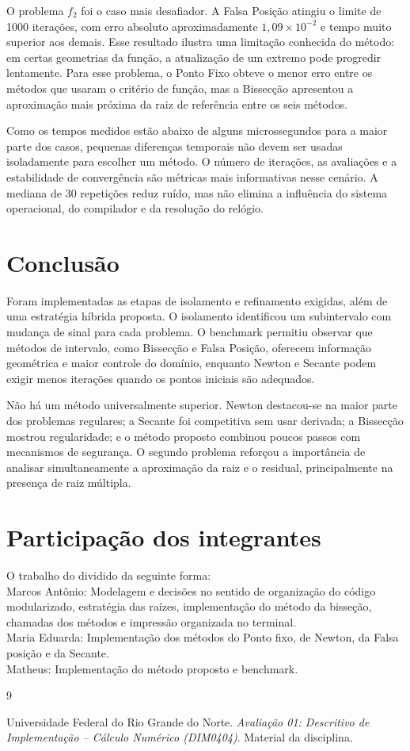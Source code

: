 \documentclass[12pt,a4paper]{article}
\begin{document}
O problema $f_2$ foi o caso mais desafiador. A Falsa Posição atingiu o limite de 1000 iterações, com erro absoluto aproximadamente $1,09\times10^{-2}$ e tempo muito superior aos demais. Esse resultado ilustra uma limitação conhecida do método: em certas geometrias da função, a atualização de um extremo pode progredir lentamente. Para esse problema, o Ponto Fixo obteve o menor erro entre os métodos que usaram o critério de função, mas a Bissecção apresentou a aproximação mais próxima da raiz de referência entre os seis métodos.

Como os tempos medidos estão abaixo de alguns microssegundos para a maior parte dos casos, pequenas diferenças temporais não devem ser usadas isoladamente para escolher um método. O número de iterações, as avaliações e a estabilidade de convergência são métricas mais informativas nesse cenário. A mediana de 30 repetições reduz ruído, mas não elimina a influência do sistema operacional, do compilador e da resolução do relógio.

\section{Conclusão}

Foram implementadas as etapas de isolamento e refinamento exigidas, além de uma estratégia híbrida proposta. O isolamento identificou um subintervalo com mudança de sinal para cada problema. O benchmark permitiu observar que métodos de intervalo, como Bissecção e Falsa Posição, oferecem informação geométrica e maior controle do domínio, enquanto Newton e Secante podem exigir menos iterações quando os pontos iniciais são adequados.

Não há um método universalmente superior. Newton destacou-se na maior parte dos problemas regulares; a Secante foi competitiva sem usar derivada; a Bissecção mostrou regularidade; e o método proposto combinou poucos passos com mecanismos de segurança. O segundo problema reforçou a importância de analisar simultaneamente a aproximação da raiz e o residual, principalmente na presença de raiz múltipla.

\section*{Participação dos integrantes}

O trabalho do dividido da seguinte forma: \\
Marcos Antônio: Modelagem e decisões no sentido de organização do código modularizado, estratégia das raízes, implementação do método da bisseção, chamadas dos métodos e impressão organizada no terminal. \\
Maria Eduarda: Implementação dos métodos do Ponto fixo, de Newton, da Falsa posição e da Secante. \\
Matheus: Implementação do método proposto e benchmark.

\begin{thebibliography}{9}

Universidade Federal do Rio Grande do Norte.
\textit{Avaliação 01: Descritivo de Implementação -- Cálculo Numérico (DIM0404)}.
Material da disciplina.

\end{thebibliography}
\end{document}
